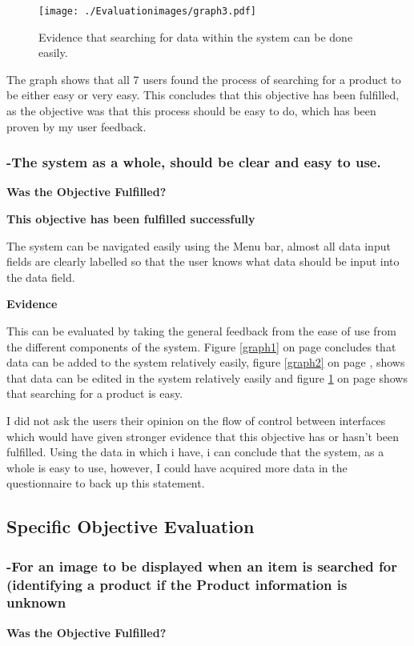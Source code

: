 \begin{figure}[H]
\caption{Evidence that searching for data within the system can be done easily.} \label{graph3}
\hfill\texttt{[image: ./Evaluationimages/graph3.pdf]}
\end{figure}

The graph shows that all 7 users found the process of searching for a product to be either easy or very easy. This concludes that this objective has been fulfilled, as the objective was that this process should be easy to do, which has been proven by my user feedback.


\pagebreak
\subsubsection{-The system as a whole, should be clear and easy to use.}
\textbf{Was the Objective Fulfilled?} \newline

\textbf{\large{This objective has been fulfilled successfully}}

The system can be navigated easily using the Menu bar, almost all data input fields are clearly labelled so that the user knows what data should be input into the data field.

\textbf{Evidence} \newline

This can be evaluated by taking the general feedback from the ease of use from the different components of the system. Figure \ref{graph1} on page \pageref{page1} concludes that data can be added to the system relatively easily, figure \ref{graph2} on page \pageref{graph2}, shows that data can be edited in the system relatively easily and figure \ref{graph3} on page \pageref{graph3} shows that searching for a product is easy.

I did not ask the users their opinion on the flow of control between interfaces which would have given stronger evidence that this objective has or hasn't been fulfilled. Using the data in which i have, i can conclude that the system, as a whole is easy to use, however, I could have acquired more data in the questionnaire to back up this statement. 

\pagebreak
\subsection{Specific Objective Evaluation}



\subsubsection{-For an image to be displayed when an item is searched for (identifying a product if the Product information is unknown}
\textbf{Was the Objective Fulfilled?} \newline


